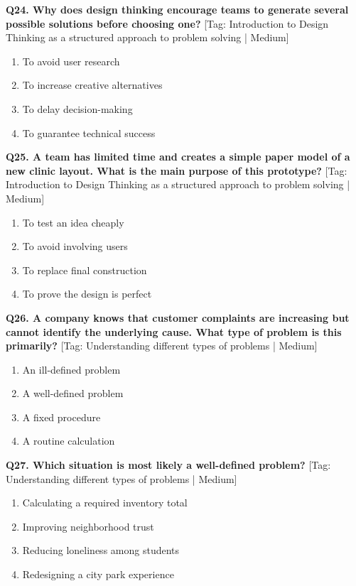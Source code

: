 \noindent\textbf{Q24. Why does design thinking encourage teams to generate several possible solutions before choosing one?} \hfill [Tag: Introduction to Design Thinking as a structured approach to problem solving | Medium]
\begin{enumerate}[label=(\alph*),topsep=2pt,itemsep=1pt,partopsep=0pt,parsep=0pt]
    \item {To avoid user research}
    \item {To increase creative alternatives}
    \item {To delay decision-making}
    \item {To guarantee technical success}
\end{enumerate}
\vspace{2mm}

\noindent\textbf{Q25. A team has limited time and creates a simple paper model of a new clinic layout. What is the main purpose of this prototype?} \hfill [Tag: Introduction to Design Thinking as a structured approach to problem solving | Medium]
\begin{enumerate}[label=(\alph*),topsep=2pt,itemsep=1pt,partopsep=0pt,parsep=0pt]
    \item {To test an idea cheaply}
    \item {To avoid involving users}
    \item {To replace final construction}
    \item {To prove the design is perfect}
\end{enumerate}
\vspace{2mm}

\noindent\textbf{Q26. A company knows that customer complaints are increasing but cannot identify the underlying cause. What type of problem is this primarily?} \hfill [Tag: Understanding different types of problems | Medium]
\begin{enumerate}[label=(\alph*),topsep=2pt,itemsep=1pt,partopsep=0pt,parsep=0pt]
    \item {An ill-defined problem}
    \item {A well-defined problem}
    \item {A fixed procedure}
    \item {A routine calculation}
\end{enumerate}
\vspace{2mm}

\noindent\textbf{Q27. Which situation is most likely a well-defined problem?} \hfill [Tag: Understanding different types of problems | Medium]
\begin{enumerate}[label=(\alph*),topsep=2pt,itemsep=1pt,partopsep=0pt,parsep=0pt]
    \item {Calculating a required inventory total}
    \item {Improving neighborhood trust}
    \item {Reducing loneliness among students}
    \item {Redesigning a city park experience}
\end{enumerate}
\vspace{2mm}

